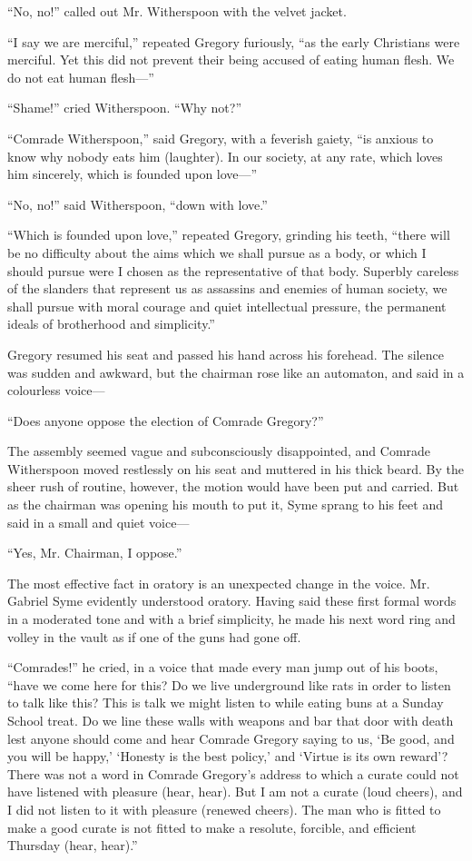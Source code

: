 “No, no!” called out Mr. Witherspoon with the velvet jacket.

“I say we are merciful,” repeated Gregory furiously, “as the early Christians were merciful. Yet this did not prevent their being accused of eating human flesh. We do not eat human flesh⁠—”

“Shame!” cried Witherspoon. “Why not?”

“Comrade Witherspoon,” said Gregory, with a feverish gaiety, “is anxious to know why nobody eats him (laughter). In our society, at any rate, which loves him sincerely, which is founded upon love⁠—”

“No, no!” said Witherspoon, “down with love.”

“Which is founded upon love,” repeated Gregory, grinding his teeth, “there will be no difficulty about the aims which we shall pursue as a body, or which I should pursue were I chosen as the representative of that body. Superbly careless of the slanders that represent us as assassins and enemies of human society, we shall pursue with moral courage and quiet intellectual pressure, the permanent ideals of brotherhood and simplicity.”

Gregory resumed his seat and passed his hand across his forehead. The silence was sudden and awkward, but the chairman rose like an automaton, and said in a colourless voice⁠—

“Does anyone oppose the election of Comrade Gregory?”

The assembly seemed vague and subconsciously disappointed, and Comrade Witherspoon moved restlessly on his seat and muttered in his thick beard. By the sheer rush of routine, however, the motion would have been put and carried. But as the chairman was opening his mouth to put it, Syme sprang to his feet and said in a small and quiet voice⁠—

“Yes, Mr. Chairman, I oppose.”

The most effective fact in oratory is an unexpected change in the voice. Mr. Gabriel Syme evidently understood oratory. Having said these first formal words in a moderated tone and with a brief simplicity, he made his next word ring and volley in the vault as if one of the guns had gone off.

“Comrades!” he cried, in a voice that made every man jump out of his boots, “have we come here for this? Do we live underground like rats in order to listen to talk like this? This is talk we might listen to while eating buns at a Sunday School treat. Do we line these walls with weapons and bar that door with death lest anyone should come and hear Comrade Gregory saying to us, ‘Be good, and you will be happy,’ ‘Honesty is the best policy,’ and ‘Virtue is its own reward’? There was not a word in Comrade Gregory’s address to which a curate could not have listened with pleasure (hear, hear). But I am not a curate (loud cheers), and I did not listen to it with pleasure (renewed cheers). The man who is fitted to make a good curate is not fitted to make a resolute, forcible, and efficient Thursday (hear, hear).”

